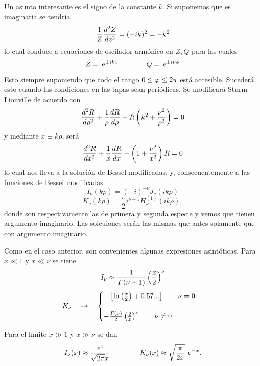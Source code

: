 \documentclass[10pt,oneside]{CBFT_book}
\begin{document}
Un asunto interesante es el signo de la constante $k$. Si suponemos que es imaginaria se
tendría
\[
	\frac{1}{Z} \dtot[2]{Z}{z} = (-ik)^2 = -k^2
\]
lo cual conduce a ecuaciones de oscilador armónico en $Z, Q$ para las cuales
\[
	Z = \euler^{\pm i k z} \qquad \qquad Q = \euler^{\pm i \nu \phi}
\]
Esto siempre suponiendo que todo el rango $0 \leq \vp \leq 2\pi$ está accesible.
Sucederá esto cuando las condiciones en las tapas sean periódicas.
Se modificará Sturm-Liouville de acuerdo con
\[
	\dtot[2]{R}{\rho} + \frac{1}{\rho} \dtot{R}{\rho} - R \left( k^2 + \frac{\nu^2}{\rho^2}\right) = 0 
\]
y mediante $x \equiv k\rho$, será
\[
	\dtot[2]{R}{x} + \frac{1}{x} \dtot{R}{x} - \left( 1 + \frac{\nu^2}{x^2}\right) R = 0 
\]
lo cual nos lleva a la solución de Bessel modificadas, y, consecuentemente 
a las funciones de Bessel modificadas
\[
	I_\nu(k\rho) = (-i)^{-\nu} J_\nu(ik\rho)
\]
\[
	K_\nu(k\rho) = \frac{\pi}{2}i^{\nu+1} H_\nu^{(1)}(ik\rho),
\]
donde son respectivamente las de primera y segunda especie y vemos que tienen 
argumento imaginario.
Las solcuiones serán las mismas que antes solamente que con argumento 
imaginario.



Como en el caso anterior, son convenientes algunas expresiones asintóticas.
Para $ x \ll 1$ y $ x \ll \nu $ se tiene
\[
	I_\nu \approx \frac{1}{\Gamma(\nu+1)} \Frac{x}{2}^\nu 
\]
\[
	K_\nu \quad \to \quad \begin{cases}
			- \left[ \ln\Frac{x}{2} + 0.57... \right] \qquad \nu=0 \\
			\\
			- \frac{\Gamma(\nu)}{2}\Frac{2}{x}^\nu \qquad \nu \neq 0
	             \end{cases}
\]

Para el límite $ x \gg 1 $ y $ x \gg \nu$ se dan
\[
	I_\nu(x) \approx \frac{\euler^{x}}{\sqrt{ 2 \pi } x} \: \qquad \qquad 
	K_\nu(x) \approx \sqrt{ \frac{\pi}{2 x} } \: \euler^{-x}.
\]
\end{document}
